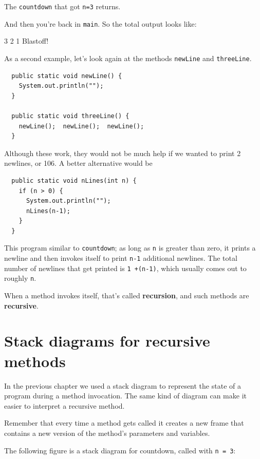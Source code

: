\documentclass[12pt]{book}
\theoremstyle{exercise}
\begin{document}
The {\tt countdown} that got {\tt n=3} returns.

\noindent And then you're back in {\tt main}.  So the
total output looks like:

\begin{verbatimtab}
3
2
1
Blastoff!
\end{verbatimtab}
%
As a second example, let's look again at the methods
{\tt newLine} and {\tt threeLine}.

\begin{lstlisting}
  public static void newLine() {
    System.out.println("");
  }

  public static void threeLine() {
    newLine();  newLine();  newLine();
  }
\end{lstlisting}
%
Although these work, they would not be much help if we wanted
to print 2 newlines, or 106.  A better alternative would be

\begin{lstlisting}
  public static void nLines(int n) {
    if (n > 0) {
      System.out.println("");
      nLines(n-1);
    }
  }
\end{lstlisting}
%
This program similar to {\tt countdown}; as long as {\tt n} is greater
than zero, it prints a newline and then invokes itself to
print {\tt n-1} additional newlines.  The total number
of newlines that get printed is {\tt 1 +(n-1)}, which usually
comes out to roughly {\tt n}.


When a method invokes itself, that's called {\bf recursion}, and
such methods are {\bf recursive}.


\section{Stack diagrams for recursive methods}

In the previous chapter we used a stack diagram to represent the
state of a program during a method invocation.  The same kind
of diagram can make it easier to interpret a recursive method.

Remember that every time a method gets called it creates
a new frame that contains a new version of
the method's parameters and variables.

The following figure is a stack diagram for countdown, called
with {\tt n = 3}:
\end{document}
